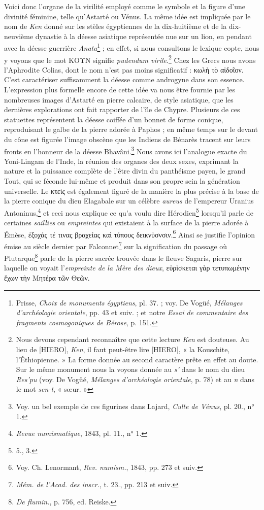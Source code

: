 \documentclass[a4paper, 11pt, oneside]{article}
\begin{document}
Voici donc l'organe de la virilité employé comme le symbole et la figure d'une divinité féminine, telle qu'Astarté ou Vénus. La même idée est impliquée par le nom de \emph{Ken} donné sur les stèles égyptiennes de la dix-huitième et de la dix-neuvième dynastie à la déesse asiatique représentée nue sur un lion, en pendant avec la déesse guerrière \emph{Anata}\footnote{Prisse, \emph{Choix de monuments égyptiens}, pl. 37. ; voy. De Vogüé, \emph{Mélanges d'archéologie orientale}, pp. 43 et suiv. ; et notre \emph{Essai de commentaire des fragments cosmogoniques de Bérose}, p. 151.} ; en effet, si nous consultons le lexique copte, nous y voyons que le mot ΚΟΥΝ signifie \emph{pudendum virile}.\footnote{Nous devons cependant reconnaître que cette lecture \emph{Ken} est douteuse. Au lieu de [HIERO], \emph{Ken}, il faut peut-être lire [HIERO], « la Kouschite, l'Éthiopienne. » La forme donnée au second caractère prête en effet au doute. Sur le même monument nous la voyons donnée au \emph{s'} dans le nom du dieu \emph{Res'pu} (voy. De Vogüé, \emph{Mélanges d'archéologie orientale}, p. 78) et au \emph{n} dans le mot \emph{sen-t}, « sœur. »} Chez les Grecs nous avons l'Aphrodite Colias, dont le nom n'est pas moins significatif : κωλὴ τὸ αἰδοῖον. C'est caractériser suffisamment la déesse comme androgyne dans son essence. L'expression plus formelle encore de cette idée va nous être fournie par les nombreuses images d'Astarté en pierre calcaire, de style asiatique, que les dernières explorations ont fait rapporter de l'île de Chypre. Plusieurs de ces statuettes représentent la déesse coiffée d'un bonnet de forme conique, reproduisant le galbe de la pierre adorée à Paphos ; en même temps sur le devant du cône est figurée l'image obscène que les Indiens de Bénarès tracent sur leurs fronts en l'honneur de la déesse Bhavâni.\footnote{Voy. un bel exemple de ces figurines dans Lajard, \emph{Culte de Vénus}, pl. 20., n° 1.} Nous avons ici l'analogue exacte du Yoni-Lingam de l'Inde, la réunion des organes des deux sexes, exprimant la nature et la puissance complète de l'être divin du panthéisme payen, le grand Tout, qui se féconde lui-même et produit dans son propre sein la génération universelle. Le κτεὶς est également figuré de la manière la plus précise à la base de la pierre conique du dieu Elagabale sur un célèbre \emph{aureus} de l'empereur Uranius Antoninus,\footnote{\emph{Revue numismatique}, 1843, pl. 11., n° 1.} et ceci nous explique ce qu'a voulu dire Hérodien\footnote{5., 3.} lorsqu'il parle de certaines \emph{saillies} ou \emph{empreintes} qui existaient à la surface de la pierre adorée à Émèse, ἐξοχάς τέ τινας βραχεἰας καὶ τύπους δεικνὑσνσιν.\footnote{Voy. Ch. Lenormant, \emph{Rev. numism.}, 1843, pp. 273 et suiv.} Ainsi se justifie l'opinion émise au siècle dernier par Falconnet\footnote{\emph{Mém. de l'Acad. des inscr.}, t. 23., pp. 213 et suiv.} sur la signification du passage où Plutarque\footnote{\emph{De flumin.}, p. 756, ed. Reiske.} parle de la pierre sacrée trouvée dans le fleuve Sagaris, pierre sur laquelle on voyait l'\emph{empreinte de la Mère des dieux}, εὑρὶσκεται γὰρ τετυπωμένην ἔχων τὴν Μητέρα τῶν Θεῶν.
\end{document}
